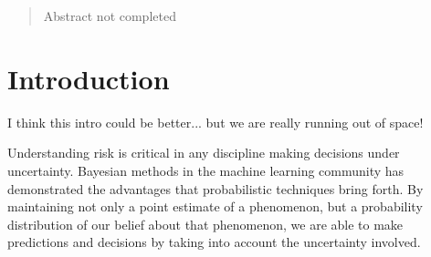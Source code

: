 \documentclass[twoside]{article} \usepackage{aistats2017}
\theoremstyle{definition}
\theoremstyle{theorem}
\newcommand{\warn}[1]{{\color{red} #1}}
\begin{document}
%

%


\begin{abstract}

	\warn{Abstract not completed}
	
\end{abstract}

\section{Introduction}
\label{sec:introduction}
	
	\warn{I think this intro could be better... but we are really running out of space!}

	Understanding risk is critical in any discipline making decisions under uncertainty. Bayesian methods in the machine learning community has demonstrated the advantages that probabilistic techniques bring forth. By maintaining not only a point estimate of a phenomenon, but a probability distribution of our belief about that phenomenon, we are able to make predictions and decisions by taking into account the uncertainty involved.
%
%
	
\end{document}
